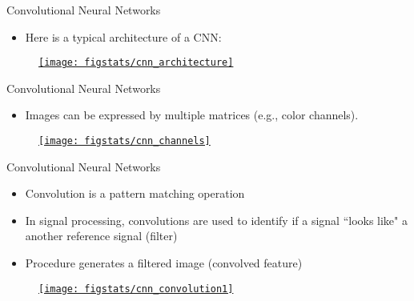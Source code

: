 \documentclass[9pt]{beamer}
\begin{document}
\begin{frame}{Convolutional Neural Networks}

\begin{itemize}
\item Here is a typical architecture of a CNN:
\end{itemize}

\begin{figure}[!htb]
    \centering
	\href{https://towardsdatascience.com/a-comprehensive-guide-to-convolutional-neural-networks-the-eli5-way-3bd2b1164a53}{\texttt{[image: figstats/cnn\_architecture]}}
\end{figure}

\end{frame}

\begin{frame}{Convolutional Neural Networks}

\begin{itemize}
\item Images can be expressed by multiple matrices (e.g., color channels).
\end{itemize}

\begin{figure}[!htb]
    \centering
		\href{https://towardsdatascience.com/a-comprehensive-guide-to-convolutional-neural-networks-the-eli5-way-3bd2b1164a53}{\texttt{[image: figstats/cnn\_channels]}}
\end{figure}

\end{frame}

\begin{frame}{Convolutional Neural Networks}

\begin{itemize}
   \setlength{\itemsep}{10pt}
\item Convolution is a pattern matching operation 
\item In signal processing, convolutions are used to identify if a signal ``looks like" a another reference signal (filter)
\item Procedure generates a filtered image (convolved feature)
\end{itemize}


\begin{figure}[!htb]
    \centering
		\href{https://towardsdatascience.com/a-comprehensive-guide-to-convolutional-neural-networks-the-eli5-way-3bd2b1164a53}{\texttt{[image: figstats/cnn\_convolution1]}}
\end{figure}

\end{frame}
\end{document}

